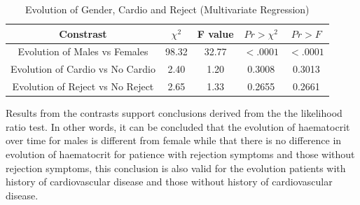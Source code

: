 \documentclass[11pt]{article}
\begin{document}
\begin{table}[H]
\centering
\begin{tabular}{ccccc}
\hline
Constrast & $\chi^2$ & F value & $Pr > \chi^2$ & $Pr > F$ \\
\hline
Evolution of Males vs Females & 98.32 & 32.77 & $<.0001$ &  $ <.0001$ \\
Evolution of Cardio vs No Cardio & 2.40 & 1.20& 0.3008 &  0.3013  \\
Evolution of Reject vs No Reject & 2.65 & 1.33& 0.2655 &0.2661  \\
\hline
\end{tabular}
\caption{Evolution of Gender, Cardio and Reject (Multivariate Regression)}
\end{table}

Results from the contrasts support conclusions derived from the the likelihood ratio test. In other words, it can be concluded that the evolution of haematocrit over time for males is different from female while that there is no difference in evolution of haematocrit for patience with rejection symptoms and those without rejection symptoms, this conclusion is also valid for the evolution patients with history of cardiovascular  disease and those without history of cardiovascular disease.
\end{document}
